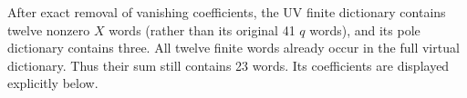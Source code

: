 After exact removal of vanishing coefficients, the UV finite dictionary
contains twelve nonzero $X$ words (rather than its original 41 $q$ words),
and its pole dictionary contains three.  All twelve finite words already
occur in the full virtual dictionary.  Thus their sum still contains
23 words.  Its coefficients are displayed explicitly below.

















